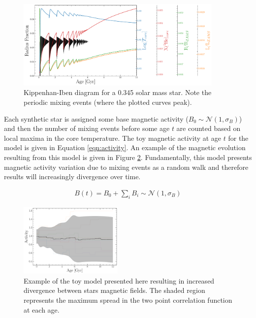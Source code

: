\begin{figure}
  \centering
  \includegraphics[width=0.9\textwidth]{figures/jaoMagActivity/Kippenhan_clamped.pdf}
  \caption{Kippenhan-Iben diagram for a 0.345 solar mass star. Note the
  periodic mixing events (where the plotted curves peak).}
  \label{fig:kippenhan}
\end{figure}

Each synthetic star is assigned some base magnetic activity ($B_{0} \sim
\mathcal{N}(1, \sigma_{B})$) and then the number of mixing events before some age $t$
are counted based on local maxima in the core temperature. The toy magnetic
activity at age $t$ for the model is given in Equation \ref{eqn:activity}. An
example of the magnetic evolution resulting from this model is given in Figure
\ref{fig:simpleB}. Fundamentally, this model presents magnetic
activity variation due to mixing events as a random walk and therefore results will
increasingly divergence over time.

\begin{align}\label{eqn:activity}
  B(t) = B_{0} + \sum_{i}B_{i} \sim \mathcal{N}(1, \sigma_{B}) 
\end{align}

\begin{figure}
  \centering
  \includegraphics[width=0.45\textwidth]{figures/jaoMagActivity/simpleBEvolution.pdf}
  \caption{Example of the toy model presented here resulting in increased
  divergence between stars magnetic fields. The shaded region represents the
  maximum spread in the two point correlation function at each age.}
  \label{fig:simpleB}
\end{figure}

